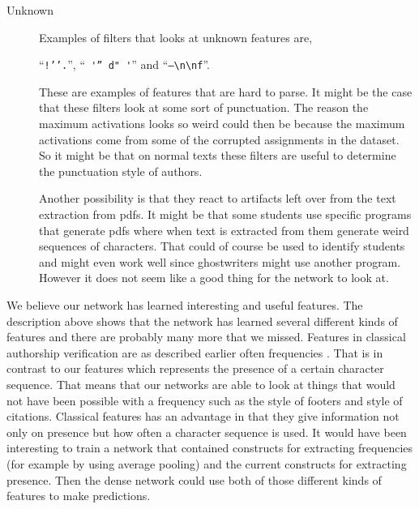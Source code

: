 \begin{description}
    \item[Unknown]

        Examples of filters that looks at unknown features are,

        ``\verb|!’’.|'', ``\verb| '” d" '|'' and ``\verb|–\n\nf|''.

        These are examples of features that are hard to parse. It might be
        the case that these filters look at some sort of punctuation. The
        reason the maximum activations looks so weird could then be because the
        maximum activations come from some of the corrupted assignments in the
        dataset. So it might be that on normal texts these filters are useful to
        determine the punctuation style of authors.

        Another possibility is that they react to artifacts left over from the
        text extraction from pdfs. It might be that some students use specific
        programs that generate pdfs where when text is extracted from them
        generate weird sequences of characters. That could of course be used to
        identify students and might even work well since ghostwriters might use
        another program. However it does not seem like a good thing for the
        network to look at.

\end{description}

We believe our network has learned interesting and useful features. The
description above shows that the network has learned several different kinds
of features and there are probably many more that we missed. Features in
classical authorship verification are as described earlier often frequencies
\citep{stamatos2009}. That is in contrast to our features which represents the
presence of a certain character sequence. That means that our networks are able
to look at things that would not have been possible with a frequency such as the
style of footers and style of citations. Classical features has an advantage
in that they give information not only on presence but how often a character
sequence is used. It would have been interesting to train a network that
contained constructs for extracting frequencies (for example by using average
pooling) and the current constructs for extracting presence. Then the dense
network could use both of those different kinds of features to make predictions.
